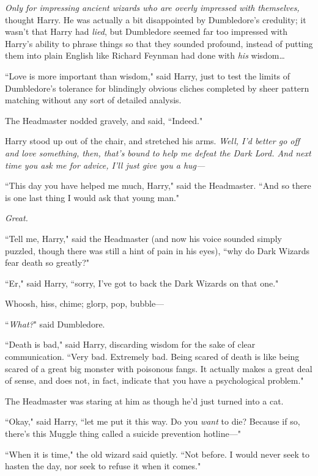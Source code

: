 \emph{Only for impressing ancient wizards who are overly impressed with themselves,} thought Harry. He was actually a bit disappointed by Dumbledore's credulity; it wasn't that Harry had \emph{lied}, but Dumbledore seemed far too impressed with Harry's ability to phrase things so that they sounded profound, instead of putting them into plain English like Richard Feynman had done with \emph{his} wisdom{\ldots}

``Love is more important than wisdom," said Harry, just to test the limits of Dumbledore's tolerance for blindingly obvious cliches completed by sheer pattern matching without any sort of detailed analysis.

The Headmaster nodded gravely, and said, ``Indeed."

Harry stood up out of the chair, and stretched his arms. \emph{Well, I'd better go off and love something, then, that's bound to help me defeat the Dark Lord. And next time you ask me for advice, I'll just give you a hug—}

``This day you have helped me much, Harry," said the Headmaster. ``And so there is one last thing I would ask that young man."

\emph{Great.}

``Tell me, Harry," said the Headmaster (and now his voice sounded simply puzzled, though there was still a hint of pain in his eyes), ``why do Dark Wizards fear death so greatly?"

``Er," said Harry, ``sorry, I've got to back the Dark Wizards on that one."

\later

Whoosh, hiss, chime; glorp, pop, bubble—

``\emph{What?}" said Dumbledore.

``Death is bad," said Harry, discarding wisdom for the sake of clear communication. ``Very bad. Extremely bad. Being scared of death is like being scared of a great big monster with poisonous fangs. It actually makes a great deal of sense, and does not, in fact, indicate that you have a psychological problem."

The Headmaster was staring at him as though he'd just turned into a cat.

``Okay," said Harry, ``let me put it this way. Do you \emph{want} to die? Because if so, there's this Muggle thing called a suicide prevention hotline—"

``When it is time," the old wizard said quietly. ``Not before. I would never seek to hasten the day, nor seek to refuse it when it comes."

